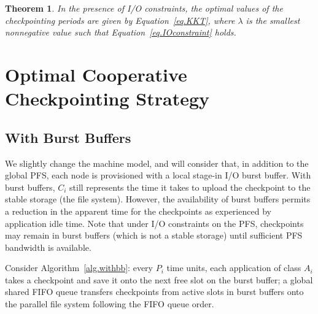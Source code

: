 \documentclass[conference]{IEEEtran}
\newtheorem{theorem}{Theorem}
\newcommand{\app}[1]{A_{#1}}
\newcommand{\period}[1]{P_{#1}}
\newcommand{\ckpt}[1]{C_{#1}}
\begin{document}
   \begin{theorem}
  In the presence of I/O constraints, the optimal values of the checkpointing periods are given
  by Equation~\eqref{eq.KKT}, where $\lambda$ is the smallest nonnegative value such that
  Equation~\ref{eq.IOconstraint} holds.
\end{theorem}

\section{Optimal Cooperative Checkpointing Strategy}
\label{sec.strategy}

\subsection{With Burst Buffers}

We slightly change the machine model, and will consider that, in addition
to the global PFS, each node is provisioned with a local stage-in I/O
burst buffer. With burst buffers, $\ckpt{i}$ still represents the time it
takes to upload the checkpoint to the stable storage (the file system).
However, the availability of burst buffers permits a reduction in the
apparent time for the checkpoints as experienced by application idle
time. Note that under I/O constraints on the PFS, checkpoints may remain
in burst buffers (which is not a stable storage) until sufficient
PFS bandwidth is available.

Consider Algorithm~\ref{alg.withbb}: every $\period{i}$ time
units, each application of class $\app{i}$ takes a checkpoint and save
it onto the next free slot on the burst buffer; a global shared FIFO
queue transfers checkpoints from active slots in burst buffers onto
the parallel file system following the FIFO queue order.
\end{document}
